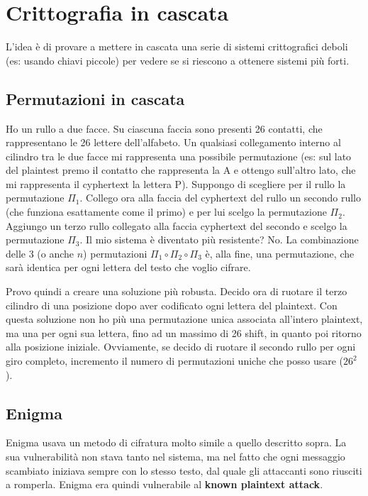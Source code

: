 \chapter{Crittografia in cascata}
\label{chapter2}

L'idea è di provare a mettere in cascata una serie di sistemi crittografici deboli (es: usando chiavi piccole) per vedere se si riescono a ottenere sistemi più forti. 

\section{Permutazioni in cascata} 
Ho un rullo a due facce. Su ciascuna faccia sono presenti 26 contatti, che rappresentano le 26 lettere dell'alfabeto. Un qualsiasi collegamento interno al cilindro tra le due facce mi rappresenta una possibile permutazione (es: sul lato del plaintest premo il contatto che rappresenta la A e ottengo sull'altro lato, che mi rappresenta il cyphertext la lettera P). Suppongo di scegliere per il rullo la permutazione $\Pi_1$. Collego ora alla faccia del cyphertext del rullo un secondo rullo (che funziona esattamente come il primo) e per lui scelgo la permutazione $\Pi_2$. Aggiungo un terzo rullo collegato alla faccia cyphertext del secondo e scelgo la permutazione $\Pi_3$. Il mio sistema è diventato più resistente? No. La combinazione delle 3 (o anche $n$) permutazioni $\Pi_1 \circ \Pi_2 \circ \Pi_3$ è, alla fine, una permutazione, che sarà identica per ogni lettera del testo che voglio cifrare.

Provo quindi a creare una soluzione più robusta. Decido ora di ruotare il terzo cilindro di una posizione dopo aver codificato ogni lettera del plaintext. Con questa soluzione non ho più una permutazione unica associata all'intero plaintext, ma una per ogni sua lettera, fino ad un massimo di 26 shift, in quanto poi ritorno alla posizione iniziale. Ovviamente, se decido di ruotare il secondo rullo per ogni giro completo, incremento il numero di permutazioni uniche che posso usare ($26^2$).

\section{Enigma} 
Enigma usava un metodo di cifratura molto simile a quello descritto sopra. La sua vulnerabilità non stava tanto nel sistema, ma nel fatto che ogni messaggio scambiato iniziava sempre con lo stesso testo, dal quale gli attaccanti sono riusciti a romperla. Enigma era quindi vulnerabile al \textbf{known plaintext attack}.

